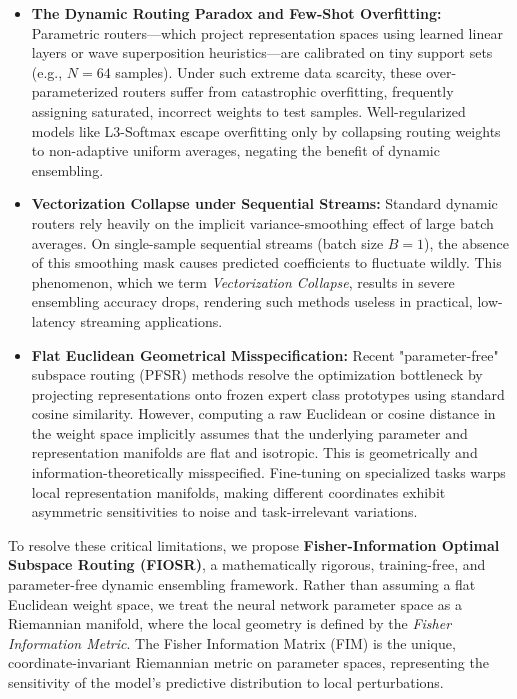 \begin{itemize}\setlength{\itemsep}{0.5pt}\setlength{\parskip}{0pt}
    \item \textbf{The Dynamic Routing Paradox and Few-Shot Overfitting:} Parametric routers—which project representation spaces using learned linear layers or wave superposition heuristics—are calibrated on tiny support sets (e.g., $N=64$ samples). Under such extreme data scarcity, these over-parameterized routers suffer from catastrophic overfitting, frequently assigning saturated, incorrect weights to test samples. Well-regularized models like L3-Softmax escape overfitting only by collapsing routing weights to non-adaptive uniform averages, negating the benefit of dynamic ensembling.
    
    \item \textbf{Vectorization Collapse under Sequential Streams:} Standard dynamic routers rely heavily on the implicit variance-smoothing effect of large batch averages. On single-sample sequential streams (batch size $B=1$), the absence of this smoothing mask causes predicted coefficients to fluctuate wildly. This phenomenon, which we term \emph{Vectorization Collapse}, results in severe ensembling accuracy drops, rendering such methods useless in practical, low-latency streaming applications.
    
    \item \textbf{Flat Euclidean Geometrical Misspecification:} Recent "parameter-free" subspace routing (PFSR) methods resolve the optimization bottleneck by projecting representations onto frozen expert class prototypes using standard cosine similarity. However, computing a raw Euclidean or cosine distance in the weight space implicitly assumes that the underlying parameter and representation manifolds are flat and isotropic. This is geometrically and information-theoretically misspecified. Fine-tuning on specialized tasks warps local representation manifolds, making different coordinates exhibit asymmetric sensitivities to noise and task-irrelevant variations.
\end{itemize}

To resolve these critical limitations, we propose \textbf{Fisher-Information Optimal Subspace Routing (FIOSR)}, a mathematically rigorous, training-free, and parameter-free dynamic ensembling framework. Rather than assuming a flat Euclidean weight space, we treat the neural network parameter space as a Riemannian manifold, where the local geometry is defined by the \emph{Fisher Information Metric}. The Fisher Information Matrix (FIM) is the unique, coordinate-invariant Riemannian metric on parameter spaces, representing the sensitivity of the model's predictive distribution to local perturbations.

